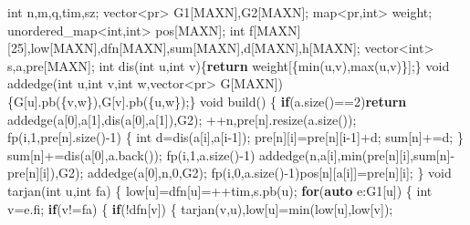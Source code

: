 \documentclass[
]{article}
\newenvironment{Shaded}{}{}
\newcommand{\ControlFlowTok}[1]{\textcolor[rgb]{0.00,0.44,0.13}{\textbf{#1}}}
\newcommand{\DataTypeTok}[1]{\textcolor[rgb]{0.56,0.13,0.00}{#1}}
\newcommand{\DecValTok}[1]{\textcolor[rgb]{0.25,0.63,0.44}{#1}}
\newcommand{\KeywordTok}[1]{\textcolor[rgb]{0.00,0.44,0.13}{\textbf{#1}}}
\newcommand{\NormalTok}[1]{#1}
\begin{document}
\begin{Shaded}
\begin{Highlighting}[]
\DataTypeTok{int}\NormalTok{ n,m,q,tim,sz;}
\NormalTok{vector\textless{}pr\textgreater{} G1[MAXN],G2[MAXN];}
\NormalTok{map\textless{}pr,}\DataTypeTok{int}\NormalTok{\textgreater{} weight;}
\NormalTok{unordered\_map\textless{}}\DataTypeTok{int}\NormalTok{,}\DataTypeTok{int}\NormalTok{\textgreater{} pos[MAXN];}
\DataTypeTok{int}\NormalTok{ f[MAXN][}\DecValTok{25}\NormalTok{],low[MAXN],dfn[MAXN],sum[MAXN],d[MAXN],h[MAXN];}
\NormalTok{vector\textless{}}\DataTypeTok{int}\NormalTok{\textgreater{} s,a,pre[MAXN];}
\DataTypeTok{int}\NormalTok{ dis(}\DataTypeTok{int}\NormalTok{ u,}\DataTypeTok{int}\NormalTok{ v)\{}\ControlFlowTok{return}\NormalTok{ weight[\{min(u,v),max(u,v)\}];\}}
\DataTypeTok{void}\NormalTok{ addedge(}\DataTypeTok{int}\NormalTok{ u,}\DataTypeTok{int}\NormalTok{ v,}\DataTypeTok{int}\NormalTok{ w,vector\textless{}pr\textgreater{} G[MAXN])\{G[u].pb(\{v,w\}),G[v].pb(\{u,w\});\}}
\DataTypeTok{void}\NormalTok{ build()}
\NormalTok{\{}
    \ControlFlowTok{if}\NormalTok{(a.size()==}\DecValTok{2}\NormalTok{)}\ControlFlowTok{return}\NormalTok{ addedge(a[}\DecValTok{0}\NormalTok{],a[}\DecValTok{1}\NormalTok{],dis(a[}\DecValTok{0}\NormalTok{],a[}\DecValTok{1}\NormalTok{]),G2);}
\NormalTok{    ++n,pre[n].resize(a.size());}
\NormalTok{    fp(i,}\DecValTok{1}\NormalTok{,pre[n].size(){-}}\DecValTok{1}\NormalTok{)}
\NormalTok{    \{}
        \DataTypeTok{int}\NormalTok{ d=dis(a[i],a[i{-}}\DecValTok{1}\NormalTok{]);}
\NormalTok{        pre[n][i]=pre[n][i{-}}\DecValTok{1}\NormalTok{]+d;}
\NormalTok{        sum[n]+=d;}
\NormalTok{    \}}
\NormalTok{    sum[n]+=dis(a[}\DecValTok{0}\NormalTok{],a.back());}
\NormalTok{    fp(i,}\DecValTok{1}\NormalTok{,a.size(){-}}\DecValTok{1}\NormalTok{)}
\NormalTok{        addedge(n,a[i],min(pre[n][i],sum[n]{-}pre[n][i]),G2);    }
\NormalTok{    addedge(a[}\DecValTok{0}\NormalTok{],n,}\DecValTok{0}\NormalTok{,G2);}
\NormalTok{    fp(i,}\DecValTok{0}\NormalTok{,a.size(){-}}\DecValTok{1}\NormalTok{)pos[n][a[i]]=pre[n][i];}
\NormalTok{\}}
\DataTypeTok{void}\NormalTok{ tarjan(}\DataTypeTok{int}\NormalTok{ u,}\DataTypeTok{int}\NormalTok{ fa)}
\NormalTok{\{}
\NormalTok{    low[u]=dfn[u]=++tim,s.pb(u);}
    \ControlFlowTok{for}\NormalTok{(}\KeywordTok{auto}\NormalTok{ e:G1[u])}
\NormalTok{    \{}
        \DataTypeTok{int}\NormalTok{ v=e.fi;}
        \ControlFlowTok{if}\NormalTok{(v!=fa)}
\NormalTok{        \{}
            \ControlFlowTok{if}\NormalTok{(!dfn[v])}
\NormalTok{            \{}
\NormalTok{                tarjan(v,u),low[u]=min(low[u],low[v]);}

\end{Highlighting}
\end{Shaded}
\end{document}
